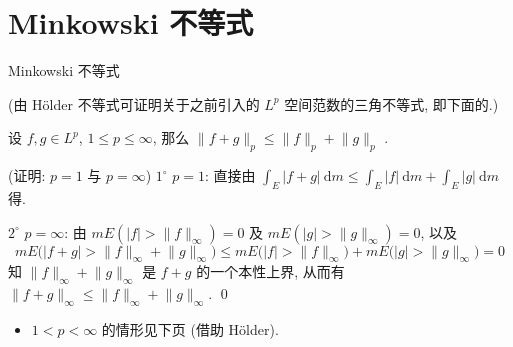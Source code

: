 
\section[Minkowski]{Minkowski 不等式}


\begin{frame}{Minkowski 不等式}

(由 Hölder 不等式可证明关于之前引入的 $L^p$ 空间范数的三角不等式, 即下面的.)

\begin{thm}
设 $f, g \in L^p$, $1 \leqslant p \leqslant \infty$, 那么
$\lVert f + g \rVert_p \leqslant \lVert f \rVert_p + \lVert g \rVert_p$ .
\end{thm}

\startproof[bg=yellow, fg=red](证明: $p = 1$ 与 $p = \infty$)
$1^{\circ}$ $p = 1$: 直接由
$\int_E |f+g| ~ \mathrm{d} m \leqslant \int_E |f| ~ \mathrm{d} m + \int_E |g| ~ \mathrm{d} m$ 得.

\pause

$2^{\circ}$ $p = \infty$: 由 $mE(|f| > \lVert f \rVert_\infty) = 0$ 及
$mE(|g| > \lVert g \rVert_\infty) = 0$, 以及
\[
mE \big( |f+g| > \lVert f \rVert_\infty + \lVert g \rVert_\infty \big)
\leqslant mE \big( |f| > \lVert f \rVert_\infty \big)
+ mE \big( |g| > \lVert g \rVert_\infty \big) = 0
\]
知 $\lVert f \rVert_\infty + \lVert g \rVert_\infty$ 是 $f+g$ 的一个本性上界, 从而有
$\lVert f+g \rVert_\infty \leqslant \lVert f \rVert_\infty + \lVert g \rVert_\infty$.
\qed

\pause

\begin{itemize}
\item $1 < p < \infty$ 的情形见下页 (借助 Hölder).
\end{itemize}

\end{frame}


